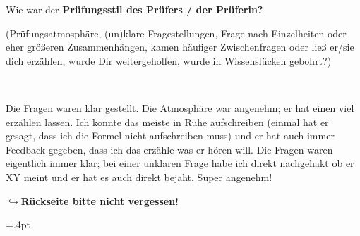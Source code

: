 \documentclass[a4paper]{article}
\begin{document}
 \textbf{} Wie war der \textbf{Prüfungsstil des Prüfers / der Prüferin?} \\
 \begin{footnotesize} (Prüfungsatmosphäre, (un)klare Fragestellungen, Frage nach Einzelheiten oder eher größeren Zusammenhängen, kamen häufiger Zwischenfragen oder ließ er/sie dich erzählen, wurde Dir weitergeholfen, wurde in Wissenslücken gebohrt?)\end{footnotesize}  \\
 \begin{minipage}[t][10cm]{\linewidth}
    Die Fragen waren klar gestellt. Die Atmosphäre war
    angenehm; er hat einen viel erzählen lassen. Ich konnte das meiste in Ruhe
    aufschreiben (einmal hat er gesagt, dass ich die Formel nicht aufschreiben
    muss) und er hat auch immer Feedback gegeben, dass ich das erzähle was er
    hören will. Die Fragen waren eigentlich immer klar; bei einer unklaren
    Frage habe ich direkt nachgehakt ob er XY meint und er hat es auch direkt
    bejaht. Super angenehm!


 \end{minipage}

 \begin{flushright}$\hookrightarrow$\textbf{Rückseite bitte nicht vergessen!}\end{flushright}

 \newpage
 \columnseprule=.4pt
\end{document}
